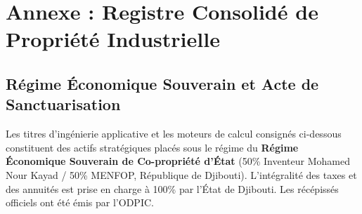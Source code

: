 \chapter*{Annexe : Registre Consolidé de Propriété Industrielle}
\label{ch:annexe_industrial_patents_total}

\section*{Régime Économique Souverain et Acte de Sanctuarisation}
Les titres d'ingénierie applicative et les moteurs de calcul consignés ci-dessous constituent des actifs stratégiques placés sous le régime du \textbf{Régime Économique Souverain de Co-propriété d'État} (50\% Inventeur Mohamed Nour Kayad / 50\% MENFOP, République de Djibouti). L'intégralité des taxes et des annuités est prise en charge à 100\% par l'État de Djibouti. Les récépissés officiels ont été émis par l'ODPIC.

